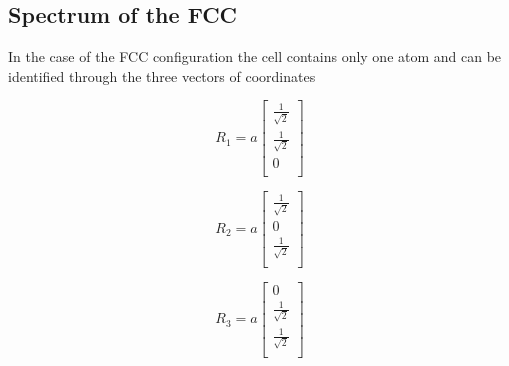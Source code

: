 \documentclass[a4paper]{article}
\begin{document}
    \subsection{Spectrum of the FCC}

    In the case of the FCC configuration the cell contains only one atom and can be identified through the three vectors of coordinates\\
    \begin{minipage}{0.3\textwidth}
    \centering
    \begin{equation*}
    R_1 = a
    \begin{bmatrix}
        \frac{1}{\sqrt{2}} \\
        \frac{1}{\sqrt{2}} \\
        0 \\
        
    \end{bmatrix}
    \end{equation*}
    
    \end{minipage}
    \begin{minipage}{0.3\textwidth}
    \centering
    \begin{equation*}
    R_2 = a
    \begin{bmatrix}
        \frac{1}{\sqrt{2}} \\
        0 \\
        \frac{1}{\sqrt{2}} \\
    \end{bmatrix}
    \end{equation*}
    \end{minipage}
    \begin{minipage}{0.3\textwidth}
    \centering
    \begin{equation*}
    R_3 = a
    \begin{bmatrix}
        0 \\
        \frac{1}{\sqrt{2}}  \\
        \frac{1}{\sqrt{2}} \\
    \end{bmatrix}
    \end{equation*}
    \end{minipage}
    
\end{document}
